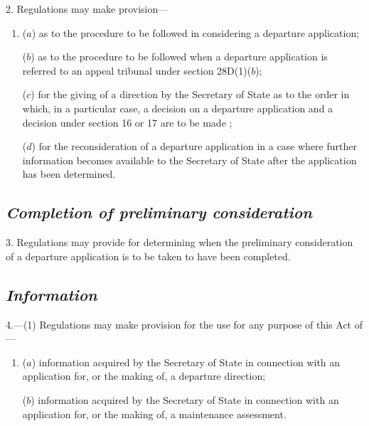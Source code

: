 \documentclass[12pt,a4paper]{article}
\begin{document}
2. Regulations may make provision—
\begin{enumerate}\item[]
($a$) as to the procedure to be followed in considering a departure application;

($b$) as to the procedure to be followed when a departure application is referred to 
an appeal tribunal  %
under section 28D(1)($b$);

($c$) for the giving of a direction by the Secretary of State as to the order in which, in a particular case, 
a decision on a departure application and a decision under section 16 or 17 are to be made%
;

($d$) for the reconsideration of a departure application in a case where further information becomes available to the Secretary of State after the application has been determined.
\end{enumerate}


\subsection*{\itshape Completion of preliminary consideration}

3. Regulations may provide for determining when the preliminary consideration of a departure application is to be taken to have been completed.

\subsection*{\itshape Information}

4.---(1) Regulations may make provision for the use for any purpose of this Act of—
\begin{enumerate}\item[]
($a$) information acquired by the Secretary of State in connection with an application for, or the making of, a departure direction;

($b$) information acquired by 
the Secretary of State in connection with an application for, or the making of, a maintenance assessment.
\end{enumerate}
\end{document}
